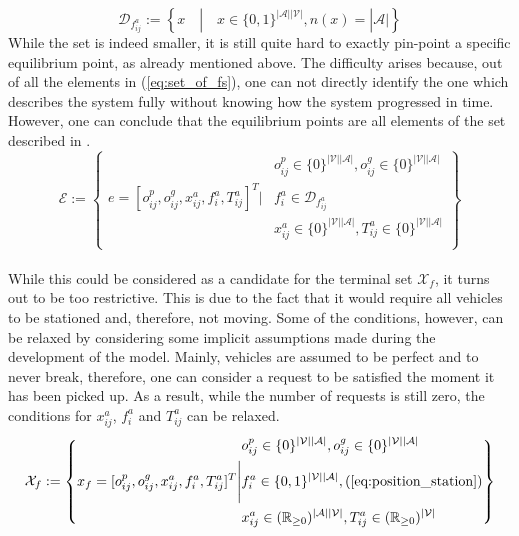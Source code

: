 \begin{equation}
\mathcal{D}_{f^a_{ij}} := 	\left\{
	x   \quad | \quad x \in \{0,1\}^{|\mathcal{A}||\mathcal{V}|},  n(x) = |\mathcal{A}|
	\right\}\label{eq:set_of_fs}
\end{equation}
While the set is indeed smaller, it is still quite hard to exactly pin-point a specific equilibrium point, as already mentioned above. The difficulty arises because, out of all the elements in (\ref{eq:set_of_fs}), one can not directly identify the one which describes the system fully without knowing how the system progressed in time. However, one can conclude that the equilibrium points are all elements of the set described in . 
\begin{equation}
	\mathcal{E} := \left\{
	\begin{aligned}
		& o^p_{ij} \in \{0\}^{|\mathcal{V}||\mathcal{A}|} , o^g_{ij} \in \{0\}^{|\mathcal{V}||\mathcal{A}|}  \\
		e = [o^p_{ij},o^g_{ij}, x_{ij}^a, f^a_{i}, T_{ij}^a]^T \Bigg| &f^a_{i} \in \mathcal{D}_{f^a_{ij}}   \\
		&  x_{ij}^a\in\{0\}^{|\mathcal{V}||\mathcal{A}|} , T^a_{ij}\in \{0\}^{|\mathcal{V}||\mathcal{A}|} \\
	\end{aligned}
	\right\}\label{eq:final_eq}
\end{equation}\\
While this could be considered as a candidate for the terminal set $\mathcal{X}_f$, it turns out to be too restrictive. This is due to the fact that it would require all vehicles to be stationed and, therefore, not moving. Some of the conditions, however, can be relaxed by considering some implicit assumptions made during the development of the model. Mainly, vehicles are assumed to be perfect and to never break, therefore, one can consider a request to be satisfied the moment it has been picked up. As a result, while the number of requests is still zero, the conditions for $x_{ij}^a$, $f_{i}^a$ and $T_{ij}^a$ can be relaxed. 
\begin{equation}
	\mathcal{X}_f := \left\{
	\begin{aligned}
		& o^p_{ij} \in \{0\}^{|\mathcal{V}||\mathcal{A}|} , o^g_{ij} \in \{0\}^{|\mathcal{V}||\mathcal{A}|}  \\
		x_f = [o^p_{ij},o^g_{ij}, x_{ij}^a, f^a_{i}, T_{ij}^a]^T \Bigg| &f^a_{i} \in \{0,1\}^{|\mathcal{V}||\mathcal{A}|}  , \text{(\ref{eq:position_station})}   \\
		&  x_{ij}^a\in (\mathbb{R}_{\ge 0})^{|\mathcal{A}||\mathcal{V}|}, T^a_{ij} \in (\mathbb{R}_{\ge 0})^{|\mathcal{V}|} \\
	\end{aligned}
	\right\}\label{eq:final_x_f}
\end{equation}\\

